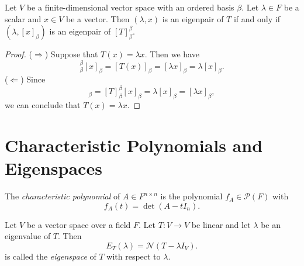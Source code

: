 \begin{theorem}
  Let $V$ be a finite-dimensional vector space with an ordered basis $\beta$.
  Let $\lambda \in F$ be a scalar and $x \in V$ be a vector.
  Then $(\lambda, x)$ is an eigenpair of $T$ if and only if
  $(\lambda, [x]_\beta)$ is an eigenpair of $[T]_\beta^\beta$.
\end{theorem}
\begin{proof}
  ($\Rightarrow$)
  Suppose that $T(x) = \lambda x$.
  Then we have
  \begin{equation*}
    [T]_\beta^\beta[x]_\beta
    = [T(x)]_\beta
    = [\lambda x]_\beta
    = \lambda [x]_\beta.
  \end{equation*}
  ($\Leftarrow$)
  Since
  \begin{equation*}
    [T(x)]_\beta
    = [T]_\beta^\beta[x]_\beta
    = \lambda[x]_\beta
    = [\lambda x]_\beta,
  \end{equation*}
  we can conclude that $T(x) = \lambda x$.
\end{proof}

\section{Characteristic Polynomials and Eigenspaces}
\begin{definition}
  The \emph{characteristic polynomial} of $A \in F^{n \times n}$ is the
  polynomial $f_A \in \mathcal{P}(F)$ with
  \begin{equation*}
    f_A(t) = \det(A - tI_n).
  \end{equation*}
\end{definition}

\begin{definition}
  Let $V$ be a vector space over a field $F$.
  Let $T: V \to V$ be linear and let $\lambda$ be an eigenvalue of $T$.
  Then
  \begin{equation*}
    E_T(\lambda) = \mathcal{N}(T - \lambda I_V).
  \end{equation*}
  is called the \emph{eigenspace} of $T$ with respect to $\lambda$.
\end{definition}